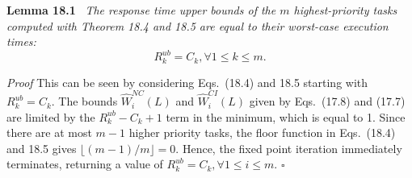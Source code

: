 \textbf{Lemma 18.1} \ \textit{The response time upper bounds of the $m$ highest-priority tasks computed with Theorem 18.4 and 18.5 are equal to their worst-case execution times:}
\[
R_k^{ub}=C_k,\forall 1\leq k\leq m.
\]

\bigskip

\noindent
\textit{Proof} This can be seen by considering Eqs.~(18.4) and 18.5 starting with $R_k^{ub}=C_k$. The bounds $\widehat{W}_i^{NC}(L)$ and $\widehat{W}_i^{CI}(L)$ given by Eqs.~(17.8) and (17.7) are limited by the $R_k^{ub}-C_k+1$ term in the minimum, which is equal to 1. Since there are at most $m-1$ higher priority tasks, the floor function in Eqs.~(18.4) and 18.5 gives $\lfloor (m-1)/m \rfloor = 0$. Hence, the fixed point iteration immediately terminates, returning a value of $R_k^{ub}=C_k,\forall 1\leq i\leq m$. \hfill $\square$